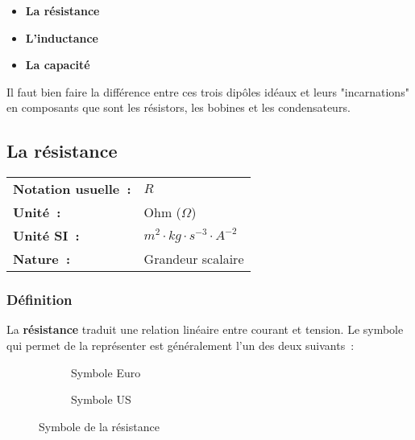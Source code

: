 \begin{itemize}
\item \textbf{La résistance}
\item \textbf{L'inductance}
\item \textbf{La capacité} \\
\end{itemize}

Il faut bien faire la différence entre ces trois dipôles idéaux et leurs "incarnations" en composants que sont les résistors, les bobines et les condensateurs. \\

\subsection{La résistance }

\vspace{0.5cm}
\begin{tabular}{ll}
\textbf{Notation usuelle~:} & $R$ \\
\textbf{Unité~:} & Ohm ($\Omega$) \\
\textbf{Unité SI~:} & $m^2 \cdot kg \cdot {s}^{-3} \cdot A^{-2}$ \\
\textbf{Nature~:} & Grandeur scalaire \\
\end{tabular} 

\subsubsection*{Définition}

La \textbf{résistance} traduit une relation linéaire entre courant et tension. Le symbole qui permet de la représenter est généralement l'un des deux suivants~:

\begin{figure}[!h]
\centering
\begin{subfigure}{.4\textwidth}
\centering
	
\caption{Symbole Euro}
\end{subfigure}%
\begin{subfigure}{.4\textwidth}
\centering
	 
\caption{Symbole US}
\end{subfigure}
\caption{Symbole de la résistance}
\end{figure}

